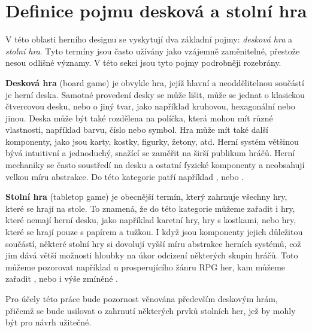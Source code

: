 \section{Definice pojmu desková a stolní hra}
\label{subsec:boardgame_definition}

V této oblasti herního designu se vyskytují dva základní pojmy: \textit{desková hra} a \textit{stolní hra}. Tyto termíny jsou často užívány jako vzájemně zaměnitelné, přestože nesou odlišné významy. V této sekci jsou tyto pojmy podrobněji rozebrány.

\textbf{Desková hra} (board game) je obvykle hra, jejíž hlavní a neoddělitelnou součástí je herní deska. Samotné provedení desky se může lišit, může se jednat o klasickou čtvercovou desku, nebo o jiný tvar, jako například kruhovou, hexagonální nebo jinou. Deska může být také rozdělena na políčka, která mohou mít různé vlastnosti, například barvu, číslo nebo symbol. Hra může mít také další komponenty, jako jsou karty, kostky, figurky, žetony, atd. Herní systém většinou bývá intuitivní a jednoduchý, snažící se zaměřit na širší publikum hráčů. Herní mechaniky se často soustředí na desku a ostatní fyzické komponenty a neobsahují velkou míru abstrakce. Do této kategorie patří například ,  nebo . \cite{board_game_supply_2023}

\textbf{Stolní hra} (tabletop game) je obecnější termín, který zahrnuje všechny hry, které se hrají na stole. To znamená, že do této kategorie můžeme zařadit i hry, které nemají herní desku, jako například karetní hry, hry s kostkami, nebo hry, které se hrají pouze s papírem a tužkou. I když jsou komponenty jejich důležitou součástí, některé stolní hry si dovolují vyšší míru abstrakce herních systémů, což jim dává větší možnosti hloubky na úkor odcizení některých skupin hráčů. Toto můžeme pozorovat například u prosperujícího žánru RPG her, kam můžeme zařadit ,  nebo i výše zmíněné . \cite{board_game_supply_2023}

Pro účely této práce bude pozornost věnována především deskovým hrám, přičemž se bude usilovat o zahrnutí některých prvků stolních her, jež by mohly být pro návrh užitečné.
